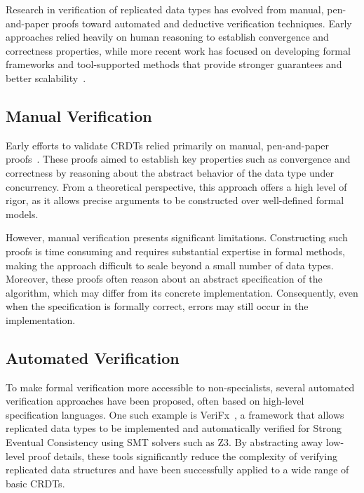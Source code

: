Research in verification of replicated data types has evolved from manual, pen-and-paper proofs toward automated and deductive verification techniques. Early approaches relied heavily on human reasoning to establish convergence and correctness properties, while more recent work has focused on developing formal frameworks and tool-supported methods that provide stronger guarantees and better scalability~\cite{porre2023masses}.

\subsection{Manual Verification}
\label{sub:manual}

Early efforts to validate CRDTs relied primarily on manual, pen-and-paper proofs~\cite{shapiro2011comprehensive}. These proofs aimed to establish key properties such as convergence and correctness by reasoning about the abstract behavior of the data type under concurrency. From a theoretical perspective, this approach offers a high level of rigor, as it allows precise arguments to be constructed over well-defined formal models.

However, manual verification presents significant limitations. Constructing such proofs is time consuming and requires substantial expertise in formal methods, making the approach difficult to scale beyond a small number of data types. Moreover, these proofs often reason about an abstract specification of the algorithm, which may differ from its concrete implementation. Consequently, even when the specification is formally correct, errors may still occur in the implementation.

\subsection{Automated Verification}
\label{sub:automated}

To make formal verification more accessible to non-specialists, several automated verification approaches have been proposed, often based on high-level specification languages. One such example is VeriFx~\cite{porre2023masses}, a framework that allows replicated data types to be implemented and automatically verified for Strong Eventual Consistency using SMT solvers such as Z3. By abstracting away low-level proof details, these tools significantly reduce the complexity of verifying replicated data structures and have been successfully applied to a wide range of basic CRDTs.

